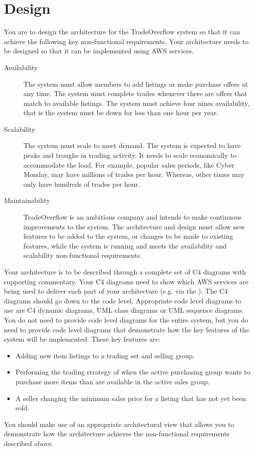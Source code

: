 \documentclass{csse4400}
\begin{document}
\section{Design}
You are to design the architecture for the TradeOverflow system so that it can achieve the following key non-functional requirements. Your architecture needs to be designed so that it can be implemented using AWS services.
\begin{description}
    \item[Availability] The system must allow members to add listings or make purchase offers at any time. The system must complete trades whenever there are offers that match to available listings. The system must achieve four nines availability, that is the system must be down for less than one hour per year.
    \item[Scalability] The system must scale to meet demand. The system is expected to have peaks and troughs in trading activity. It needs to scale economically to accommodate the load. For example, popular sales periods, like Cyber Monday, may have millions of trades per hour. Whereas, other times may only have hundreds of trades per hour.
    \item[Maintainability] TradeOverflow is an ambitious company and intends to make continuous improvements to the system. The architecture and design must allow new features to be added to the system, or changes to be made to existing features, while the system is running and meets the availability and scalability non-functional requirements.
\end{description}

Your architecture is to be described through a complete set of C4 diagrams with supporting commentary.
Your C4 diagrams need to show which AWS services are being used to deliver each part of your architecture
(e.g. via the ).
The C4 diagrams should go down to the code level.
Appropriate code level diagrams to use are C4 dynamic diagrams, UML class diagrams or UML sequence diagrams.
You do not need to provide code level diagrams for the entire system,
but you do need to provide code level diagrams that demonstrate how the key features of the system will be implemented.
These key features are:
\begin{itemize}
	\item Adding new item listings to a trading set and selling group.
	\item Performing the trading strategy of when the active purchasing group wants to purchase more items than are available in the active sales group.
	\item A seller changing the minimum sales price for a listing that has not yet been sold.
\end{itemize}
You should make use of an appropriate architectural view that allows you to demonstrate how the architecture achieves the non-functional requirements described above.
\end{document}
